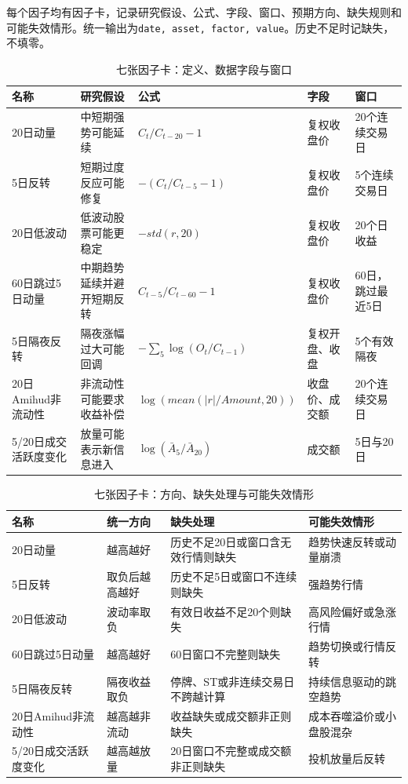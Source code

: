 \documentclass[10.5pt,a4paper]{ctexart}
\newcommand{\code}[1]{\texttt{\small #1}}
\begin{document}
每个因子均有因子卡，记录研究假设、公式、字段、窗口、预期方向、缺失规则和可能失效情形。统一输出为\code{date, asset, factor, value}。历史不足时记缺失，不填零。

\begin{table}[H]\centering\scriptsize
\caption{七张因子卡：定义、数据字段与窗口}
\begin{tabularx}{\textwidth}{p{2.2cm}p{2.5cm}Xp{2.1cm}p{2.5cm}}
\toprule 名称 & 研究假设 & 公式 & 字段 & 窗口\\\midrule
20日动量 & 中短期强势可能延续 & $C_t/C_{t-20}-1$ & 复权收盘价 & 20个连续交易日\\
5日反转 & 短期过度反应可能修复 & $-(C_t/C_{t-5}-1)$ & 复权收盘价 & 5个连续交易日\\
20日低波动 & 低波动股票可能更稳定 & $-std(r,20)$ & 复权收盘价 & 20个日收益\\
60日跳过5日动量 & 中期趋势延续并避开短期反转 & $C_{t-5}/C_{t-60}-1$ & 复权收盘价 & 60日，跳过最近5日\\
5日隔夜反转 & 隔夜涨幅过大可能回调 & $-\sum_{5}\log(O_t/C_{t-1})$ & 复权开盘、收盘 & 5个有效隔夜\\
20日Amihud非流动性 & 非流动性可能要求收益补偿 & $\log(mean(|r|/Amount,20))$ & 收盘价、成交额 & 20个连续交易日\\
5/20日成交活跃度变化 & 放量可能表示新信息进入 & $\log(\bar A_5/\bar A_{20})$ & 成交额 & 5日与20日\\\bottomrule
\end{tabularx}
\end{table}

\begin{table}[H]\centering\scriptsize
\caption{七张因子卡：方向、缺失处理与可能失效情形}
\begin{tabularx}{\textwidth}{p{2.3cm}p{2.1cm}Xp{4.0cm}}
\toprule 名称 & 统一方向 & 缺失处理 & 可能失效情形\\\midrule
20日动量 & 越高越好 & 历史不足20日或窗口含无效行情则缺失 & 趋势快速反转或动量崩溃\\
5日反转 & 取负后越高越好 & 历史不足5日或窗口不连续则缺失 & 强趋势行情\\
20日低波动 & 波动率取负 & 有效日收益不足20个则缺失 & 高风险偏好或急涨行情\\
60日跳过5日动量 & 越高越好 & 60日窗口不完整则缺失 & 趋势切换或行情反转\\
5日隔夜反转 & 隔夜收益取负 & 停牌、ST或非连续交易日不跨越计算 & 持续信息驱动的跳空趋势\\
20日Amihud非流动性 & 越高越非流动 & 收益缺失或成交额非正则缺失 & 成本吞噬溢价或小盘股混杂\\
5/20日成交活跃度变化 & 越高越放量 & 20日窗口不完整或成交额非正则缺失 & 投机放量后反转\\\bottomrule
\end{tabularx}
\end{table}
\end{document}
